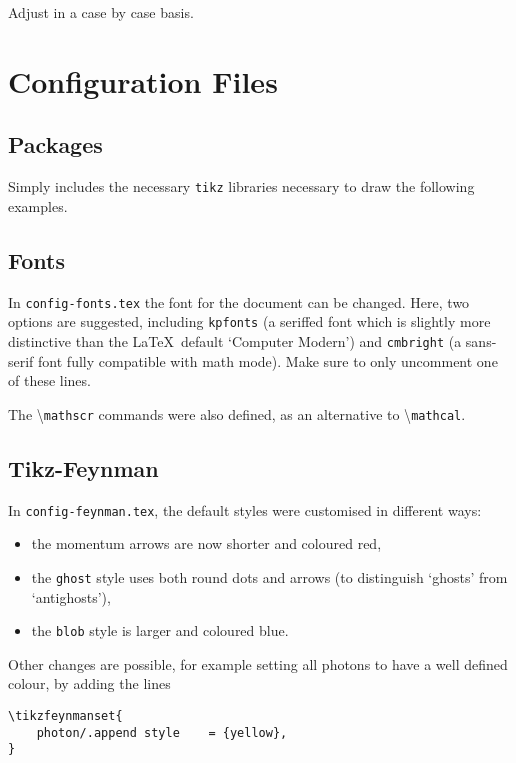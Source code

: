 \documentclass[12pt]{article}
\begin{document}
Adjust in a case by case basis.

\section{Configuration Files}


\subsection{Packages}

Simply includes the necessary \texttt{tikz} libraries necessary to draw the following examples.

\subsection{Fonts}

In \texttt{config-fonts.tex} the font for the document can be changed. Here, two options are suggested, including \texttt{kpfonts} (a seriffed font which is slightly more distinctive than the \LaTeX\, default `Computer Modern') and \texttt{cmbright} (a sans-serif font fully compatible with math mode). Make sure to only uncomment one of these lines.

The \textbackslash\texttt{mathscr} commands were also defined, as an alternative to \textbackslash\texttt{mathcal}.

\subsection{Tikz-Feynman}

In \texttt{config-feynman.tex}, the default styles were customised in different ways:

\begin{itemize}
	\item the momentum arrows are now shorter and coloured red,
	\item the \texttt{ghost} style uses both round dots and arrows (to distinguish `ghosts' from `antighosts'),
	\item the \texttt{blob} style is larger and coloured blue.
\end{itemize}

Other changes are possible, for example setting all photons to have a well defined colour, by adding the lines

\begin{verbatim}
\tikzfeynmanset{
	photon/.append style	= {yellow},
}
\end{verbatim}
\end{document}
